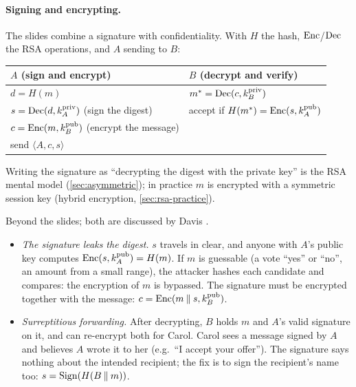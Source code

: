 \paragraph{Signing and encrypting.} The slides combine a signature with confidentiality. With $H$ the hash, $\operatorname{Enc}$/$\operatorname{Dec}$ the RSA operations, and $A$ sending to $B$:
\begin{center}
\begin{tabular}{@{}l@{\qquad}l@{}}
\toprule
$A$ (sign and encrypt) & $B$ (decrypt and verify) \\
\midrule
$d = H(m)$ & $m^* = \operatorname{Dec}(c, k_B^{\mathrm{priv}})$ \\
$s = \operatorname{Dec}(d, k_A^{\mathrm{priv}})$ \quad (sign the digest) & accept if $H(m^*) = \operatorname{Enc}(s, k_A^{\mathrm{pub}})$ \\
$c = \operatorname{Enc}(m, k_B^{\mathrm{pub}})$ \quad (encrypt the message) & \\
send $\langle A, c, s \rangle$ & \\
\bottomrule
\end{tabular}
\end{center}
Writing the signature as \enquote{decrypting the digest with the private key} is the RSA mental model (\cref{sec:asymmetric}); in practice $m$ is encrypted with a symmetric session key (hybrid encryption, \cref{sec:rsa-practice}).

\begin{remark}
Beyond the slides; both are discussed by Davis \cite{davis2001}.
\begin{itemize}
    \item \emph{The signature leaks the digest.} $s$ travels in clear, and anyone with $A$'s public key computes $\operatorname{Enc}(s, k_A^{\mathrm{pub}}) = H(m)$. If $m$ is guessable (a vote \enquote{yes} or \enquote{no}, an amount from a small range), the attacker hashes each candidate and compares: the encryption of $m$ is bypassed. The signature must be encrypted together with the message: $c = \operatorname{Enc}(m \mathbin{\|} s, k_B^{\mathrm{pub}})$.
    \item \emph{Surreptitious forwarding.} After decrypting, $B$ holds $m$ and $A$'s valid signature on it, and can re-encrypt both for Carol. Carol sees a message signed by $A$ and believes $A$ wrote it to her (e.g.\ \enquote{I accept your offer}). The signature says nothing about the intended recipient; the fix is to sign the recipient's name too: $s = \operatorname{Sign}(H(B \mathbin{\|} m))$.
\end{itemize}
\end{remark}

